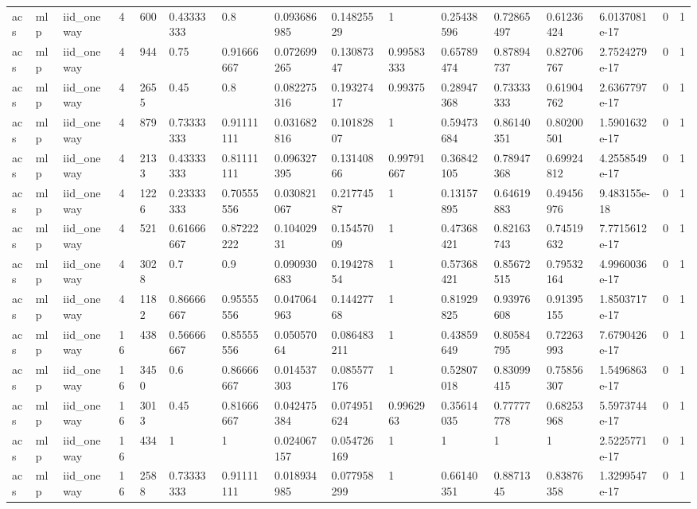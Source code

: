 \begin{tabular}{llllllllllllllll}
acs & mlp & iid\_oneway & 4 & 600 & 0.43333333 & 0.8 & 0.093686985 & 0.14825529 & 1 & 0.25438596 & 0.72865497 & 0.61236424 & 6.0137081e-17 & 0 & 1 \\
acs & mlp & iid\_oneway & 4 & 944 & 0.75 & 0.91666667 & 0.072699265 & 0.13087347 & 0.99583333 & 0.65789474 & 0.87894737 & 0.82706767 & 2.7524279e-17 & 0 & 1 \\
acs & mlp & iid\_oneway & 4 & 2655 & 0.45 & 0.8 & 0.082275316 & 0.19327417 & 0.99375 & 0.28947368 & 0.73333333 & 0.61904762 & 2.6367797e-17 & 0 & 1 \\
acs & mlp & iid\_oneway & 4 & 879 & 0.73333333 & 0.91111111 & 0.031682816 & 0.10182807 & 1 & 0.59473684 & 0.86140351 & 0.80200501 & 1.5901632e-17 & 0 & 1 \\
acs & mlp & iid\_oneway & 4 & 2133 & 0.43333333 & 0.81111111 & 0.096327395 & 0.13140866 & 0.99791667 & 0.36842105 & 0.78947368 & 0.69924812 & 4.2558549e-17 & 0 & 1 \\
acs & mlp & iid\_oneway & 4 & 1226 & 0.23333333 & 0.70555556 & 0.030821067 & 0.21774587 & 1 & 0.13157895 & 0.64619883 & 0.49456976 & 9.483155e-18 & 0 & 1 \\
acs & mlp & iid\_oneway & 4 & 521 & 0.61666667 & 0.87222222 & 0.10402931 & 0.15457009 & 1 & 0.47368421 & 0.82163743 & 0.74519632 & 7.7715612e-17 & 0 & 1 \\
acs & mlp & iid\_oneway & 4 & 3028 & 0.7 & 0.9 & 0.090930683 & 0.19427854 & 1 & 0.57368421 & 0.85672515 & 0.79532164 & 4.9960036e-17 & 0 & 1 \\
acs & mlp & iid\_oneway & 4 & 1182 & 0.86666667 & 0.95555556 & 0.047064963 & 0.14427768 & 1 & 0.81929825 & 0.93976608 & 0.91395155 & 1.8503717e-17 & 0 & 1 \\
acs & mlp & iid\_oneway & 16 & 438 & 0.56666667 & 0.85555556 & 0.05057064 & 0.086483211 & 1 & 0.43859649 & 0.80584795 & 0.72263993 & 7.6790426e-17 & 0 & 1 \\
acs & mlp & iid\_oneway & 16 & 3450 & 0.6 & 0.86666667 & 0.014537303 & 0.085577176 & 1 & 0.52807018 & 0.83099415 & 0.75856307 & 1.5496863e-17 & 0 & 1 \\
acs & mlp & iid\_oneway & 16 & 3013 & 0.45 & 0.81666667 & 0.042475384 & 0.074951624 & 0.9962963 & 0.35614035 & 0.77777778 & 0.68253968 & 5.5973744e-17 & 0 & 1 \\
acs & mlp & iid\_oneway & 16 & 434 & 1 & 1 & 0.024067157 & 0.054726169 & 1 & 1 & 1 & 1 & 2.5225771e-17 & 0 & 1 \\
acs & mlp & iid\_oneway & 16 & 2588 & 0.73333333 & 0.91111111 & 0.018934985 & 0.077958299 & 1 & 0.66140351 & 0.8871345 & 0.83876358 & 1.3299547e-17 & 0 & 1 \\

\end{tabular}
